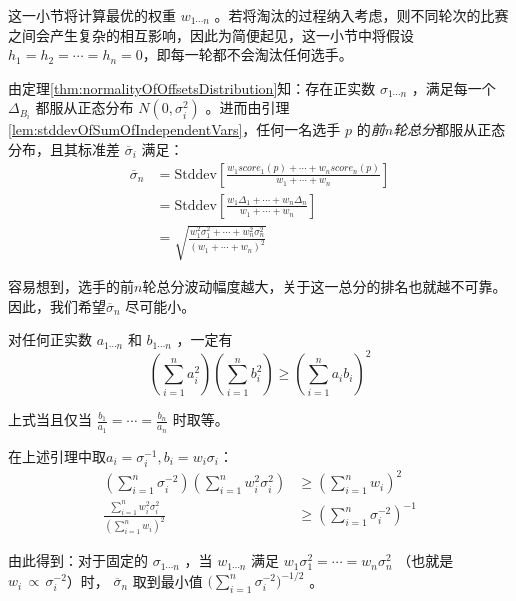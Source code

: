         这一小节将计算最优的权重 $w_{1\cdots n}$ 。若将淘汰的过程纳入考虑，则不同轮次的比赛之间会产生复杂的相互影响，因此为简便起见，这一小节中将假设$h_1=h_2=\cdots=h_n=0$，即每一轮都不会淘汰任何选手。

        \vspace{1.5ex}

        由定理\ref{thm:normalityOfOffsetsDistribution}知：存在正实数 $\sigma_{1\cdots n}$ ，满足每一个 $\Delta_{B_i}$ 都服从正态分布 $N(0,\sigma_i^2)$ 。进而由引理\ref{lem:stddevOfSumOfIndependentVars}，任何一名选手 $p$ 的\emph{前$n$轮总分}都服从正态分布，且其标准差 $\overline{\sigma}_i$ 满足：
        \begin{align*}
            \overline{\sigma}_n
            &=\mathrm{Stddev}\left[\frac{w_1\textit{score}_1(p)+\cdots+w_n\textit{score}_n(p)}{w_1+\cdots+w_n}\right] \\
            &=\mathrm{Stddev}\left[\frac{w_1\Delta_1+\cdots+w_n\Delta_n}{w_1+\cdots+w_n}\right] \\
            &=\sqrt{\frac{w_1^2\sigma_1^2+\cdots+w_n^2\sigma_n^2}{\left(w_1+\cdots+w_n\right)^2}}
        \end{align*}

        容易想到，选手的前$n$轮总分波动幅度越大，关于这一总分的排名也就越不可靠。因此，我们希望$\overline{\sigma}_n$ 尽可能小。

        \begin{lemma}[柯西不等式]
            对任何正实数 $a_{1\cdots n}$ 和 $b_{1\cdots n}$ ，一定有
            $$
            \left(\sum\limits_{i=1}^n a_i^2\right)\left(\sum\limits_{i=1}^n b_i^2\right)
            \geq\left(\sum\limits_{i=1}^n a_ib_i\right)^2
            $$

            上式当且仅当 $\frac{b_1}{a_1}=\cdots=\frac{b_n}{a_n}$ 时取等。

            \label{lem:Cauchy}
        \end{lemma}

        在上述引理中取$a_i=\sigma_i^{-1},b_i=w_i\sigma_i$：
        \begin{align*}
            \left(\sum\limits_{i=1}^n \sigma_i^{-2}\right)\left(\sum\limits_{i=1}^n w_i^2\sigma_i^2\right)&\geq\left(\sum\limits_{i=1}^n w_i\right)^2 \\
            \frac{\sum\limits_{i=1}^n w_i^2\sigma_i^2}{\left(\sum\limits_{i=1}^n w_i\right)^2}&\geq\left(\sum\limits_{i=1}^n \sigma_i^{-2}\right)^{-1}
        \end{align*}

        由此得到：对于固定的 $\sigma_{1\cdots n}$ ，当 $w_{1\cdots n}$ 满足 $w_1\sigma_1^2=\cdots=w_n\sigma_n^2$ （也就是$w_i\,\propto\, \sigma_i^{-2}$）时， $\overline{\sigma}_n$ 取到最小值 $\big(\sum_{i=1}^n \sigma_i^{-2}\big)^{-1/2}$ 。
        
